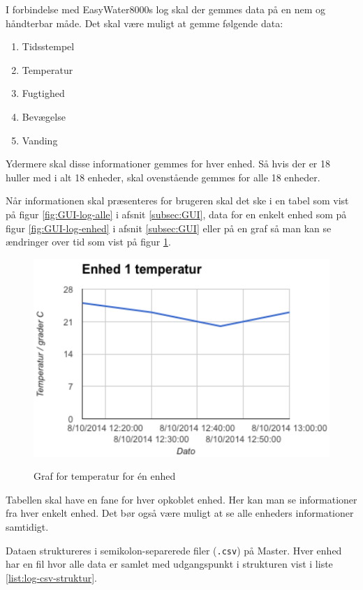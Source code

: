 
I forbindelse med EasyWater8000s log skal der gemmes data på en nem og håndterbar måde. Det skal være muligt at gemme følgende data:

\begin{enumerate}
	\item Tidsstempel
	\item Temperatur
	\item Fugtighed
	\item Bevægelse
	\item Vanding
\end{enumerate}

Ydermere skal disse informationer gemmes for hver enhed. Så hvis der er 18 huller med i alt 18 enheder, skal ovenstående gemmes for alle 18 enheder.

Når informationen skal præsenteres for brugeren skal det ske i en tabel som vist på figur \ref{fig:GUI-log-alle} i afsnit \ref{subsec:GUI}, data for en enkelt enhed som på figur \ref{fig:GUI-log-enhed} i afsnit \ref{subsec:GUI} eller på en graf så man kan se ændringer over tid som vist på figur \ref{fig:log-graf}.

\begin{figure}[htbp] \centering
{\includegraphics[scale=0.5]{filer/pics/SW-Log-graf}}
\caption{Graf for temperatur for én enhed}
\label{fig:log-graf}
\end{figure}

Tabellen skal have en fane for hver opkoblet enhed. Her kan man se informationer fra hver enkelt enhed. Det bør også være muligt at se alle enheders informationer samtidigt.

Dataen struktureres i semikolon-separerede filer (\verb+.csv+) på Master. Hver enhed har en fil hvor alle data er samlet med udgangspunkt i strukturen vist i liste \ref{list:log-csv-struktur}.

